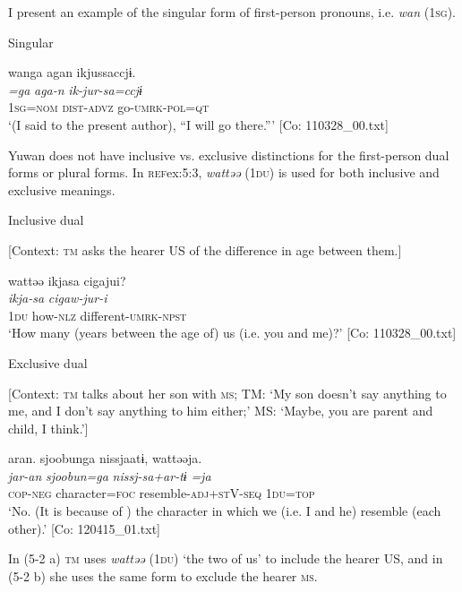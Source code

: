 I present an example of the singular form of first-person pronouns, i.e. \textit{wan} (1\textsc{sg}).

\ea \label{ex:5:2}   Singular

\glll  wanga  agan  ikjussaccjɨ.\\
\textit{=ga}  \textit{aga-n}  \textit{ik-jur-sa=ccjɨ}\\
1\textsc{sg}=\textsc{nom}  \textsc{dist}-\textsc{advz}  go-\textsc{umrk}-\textsc{pol}=\textsc{qt}\\
\glt ‘(I said to the present author), “I will go there.”’ [Co: 110328\_00.txt]
\z

Yuwan does not have inclusive vs. exclusive distinctions for the first-person dual forms or plural forms. In \textsc{ref}{ex:5:3}, \textit{wattəə} (1\textsc{du}) is used for both inclusive and exclusive meanings.

\ea \label{ex:5:3}  \ea \label{ex:5:3a} Inclusive dual

    [Context: \textsc{tm} asks the hearer US of the difference in age between them.]

\glll  wattəə  ikjasa  cigajui?\\
\textit{}  \textit{ikja-sa}  \textit{cigaw-jur-i}\\
1\textsc{du}  how-\textsc{nlz}  different-\textsc{umrk}-\textsc{npst}\\
\glt ‘How many (years between the age of) us (i.e. you and me)?’ [Co: 110328\_00.txt]

 \ex \label{ex:5:b} Exclusive dual

    [Context: \textsc{tm} talks about her son with \textsc{ms}; TM: ‘My son doesn’t say anything to me, and I don’t say anything to him either;’ MS: ‘Maybe, you are parent and child, I think.’]

\glll  aran.  sjoobunga  nissjaatɨ,  wattəəja.\\
\textit{jar-an}  \textit{sjoobun=ga}  \textit{nissj-sa+ar-tɨ}  \textit{=ja}\\
\textsc{cop}-\textsc{neg}  character=\textsc{foc}  resemble-\textsc{adj}+\textsc{st}V-\textsc{seq}  1\textsc{du}=\textsc{top}\\
\glt ‘No. (It is because of ) the character in which we (i.e. I and he) resemble (each other).’ [Co: 120415\_01.txt]
\z
\z

In (5-2 a) \textsc{tm} uses \textit{wattəə} (1\textsc{du}) ‘the two of us’ to include the hearer US, and in (5-2 b) she uses the same form to exclude the hearer \textsc{ms}.

